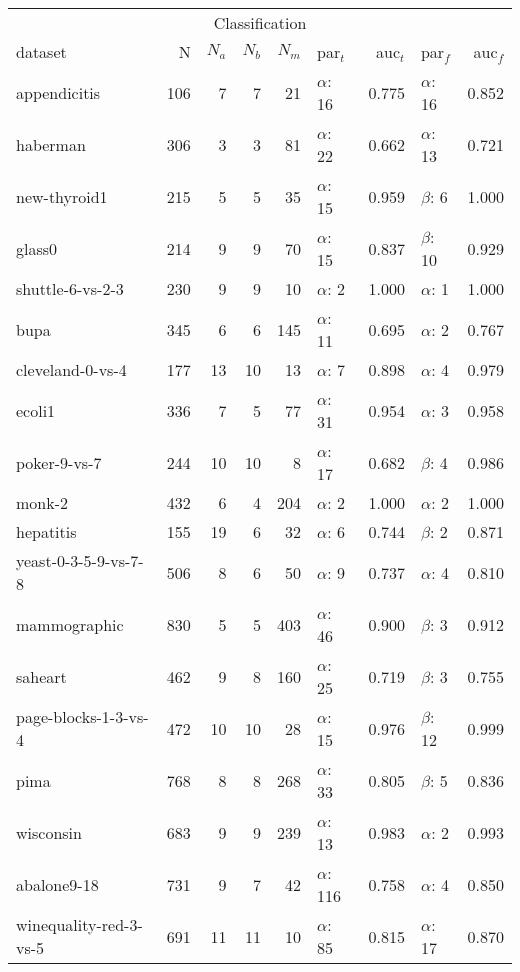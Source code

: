 \begin{tabular}{l@{\hspace{6pt}}r@{\hspace{6pt}}r@{\hspace{6pt}}r@{\hspace{6pt}}r@{\hspace{6pt}}l@{\hspace{6pt}}r@{\hspace{6pt}}l@{\hspace{6pt}}r}
\toprule
\multicolumn{9}{c}{Classification} \\
dataset & N & $N_a$ & $N_b$ & $N_m$ & par$_t$ & auc$_t$ & par$_f$ & auc$_f$ \\
\midrule
appendicitis \citep{keel} & 106 & 7 & 7 & 21 & $\alpha$: 16 & 0.775 & $\alpha$: 16 & 0.852 \\
haberman \citep{keel} & 306 & 3 & 3 & 81 & $\alpha$: 22 & 0.662 & $\alpha$: 13 & 0.721 \\
new-thyroid1 \citep{keel} & 215 & 5 & 5 & 35 & $\alpha$: 15 & 0.959 & $\beta$: 6 & 1.000 \\
glass0 \citep{keel} & 214 & 9 & 9 & 70 & $\alpha$: 15 & 0.837 & $\beta$: 10 & 0.929 \\
shuttle-6-vs-2-3 \citep{keel} & 230 & 9 & 9 & 10 & $\alpha$: 2 & 1.000 & $\alpha$: 1 & 1.000 \\
bupa \citep{keel} & 345 & 6 & 6 & 145 & $\alpha$: 11 & 0.695 & $\alpha$: 2 & 0.767 \\
cleveland-0-vs-4 \citep{keel} & 177 & 13 & 10 & 13 & $\alpha$: 7 & 0.898 & $\alpha$: 4 & 0.979 \\
ecoli1 \citep{keel} & 336 & 7 & 5 & 77 & $\alpha$: 31 & 0.954 & $\alpha$: 3 & 0.958 \\
poker-9-vs-7 \citep{keel} & 244 & 10 & 10 & 8 & $\alpha$: 17 & 0.682 & $\beta$: 4 & 0.986 \\
monk-2 \citep{keel} & 432 & 6 & 4 & 204 & $\alpha$: 2 & 1.000 & $\alpha$: 2 & 1.000 \\
hepatitis \citep{krnn} & 155 & 19 & 6 & 32 & $\alpha$: 6 & 0.744 & $\beta$: 2 & 0.871 \\
yeast-0-3-5-9-vs-7-8 \citep{keel} & 506 & 8 & 6 & 50 & $\alpha$: 9 & 0.737 & $\alpha$: 4 & 0.810 \\
mammographic \citep{keel} & 830 & 5 & 5 & 403 & $\alpha$: 46 & 0.900 & $\beta$: 3 & 0.912 \\
saheart \citep{keel} & 462 & 9 & 8 & 160 & $\alpha$: 25 & 0.719 & $\beta$: 3 & 0.755 \\
page-blocks-1-3-vs-4 \citep{keel} & 472 & 10 & 10 & 28 & $\alpha$: 15 & 0.976 & $\beta$: 12 & 0.999 \\
pima \citep{keel} & 768 & 8 & 8 & 268 & $\alpha$: 33 & 0.805 & $\beta$: 5 & 0.836 \\
wisconsin \citep{keel} & 683 & 9 & 9 & 239 & $\alpha$: 13 & 0.983 & $\alpha$: 2 & 0.993 \\
abalone9-18 \citep{keel} & 731 & 9 & 7 & 42 & $\alpha$: 116 & 0.758 & $\alpha$: 4 & 0.850 \\
winequality-red-3-vs-5 \citep{keel} & 691 & 11 & 11 & 10 & $\alpha$: 85 & 0.815 & $\alpha$: 17 & 0.870 \\
\bottomrule
\end{tabular}
